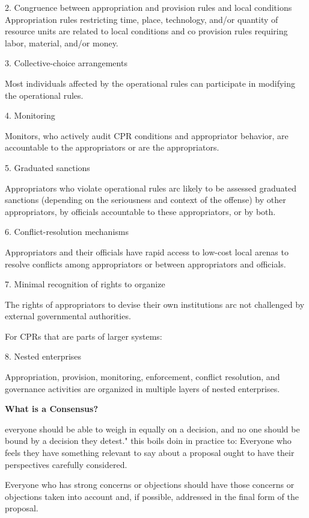\documentclass{article}
\begin{document}
2. Congruence between appropriation and provision rules and local conditions Appropriation rules restricting time, place, technology, and/or quantity of resource units are related to local conditions and co provision rules requiring labor, material, and/or money.

3. Collective-choice arrangements

Most individuals affected by the operational rules can participate in modifying the operational rules.

4. Monitoring

Monitors, who actively audit CPR conditions and appropriator behavior, are accountable to the appropriators or are the appropriators.

5. Graduated sanctions

Appropriators who violate operational rules arc likely to be assessed graduated sanctions (depending on the seriousness and context of the offense) by other appropriators, by officials accountable to these appropriators, or by both.

6. Conflict-resolution mechanisms

Appropriators and their officials have rapid access to low-cost local arenas to resolve conflicts among appropriators or between appropriators and officials.

7. Minimal recognition of rights to organize

The rights of appropriators to devise their own institutions arc not challenged by external governmental authorities.

For CPRs that are parts of larger systems:

8. Nested enterprises

Appropriation, provision, monitoring, enforcement, conflict resolution, and governance activities are organized in multiple layers of nested enterprises.





\pagebreak
{\huge \textbf{What is a Consensus?}}

everyone should be able to weigh in equally on a decision, and no one should be bound by a decision they detest."
this boils doin in practice to: Everyone who feels they have something relevant to say about a proposal ought to have their perspectives carefully considered.

Everyone who has strong concerns or objections should have those concerns or objections taken into account and, if possible, addressed in the final form of the proposal.
\end{document}
